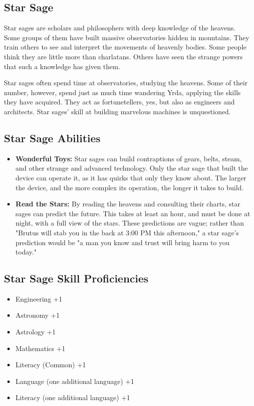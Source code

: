\begin{multicols}{2}
\section{Star Sage}

Star sages are scholars and philosophers with deep knowledge of the heavens.
Some groups of them have built massive observatories hidden in mountains. They
train others to see and interpret the movements of heavenly bodies. Some people
think they are little more than charlatans. Others have seen the strange powers
that such a knowledge has given them.

Star sages often spend time at observatories, studying the heavens. Some of their
number, however, spend just as much time wandering Yrda, applying the skills they
have acquired. They act as fortunetellers, yes, but also as engineers and architects.
Star sages' skill at building marvelous machines is unquestioned.

\subsection{Star Sage Abilities}

\begin{itemize}
  \item \textbf{Wonderful Toys:} Star sages can build contraptions of gears, belts,
    steam, and other strange and advanced technology. Only the star sage that built
    the device can operate it, as it has quirks that only they know about. The larger
    the device, and the more complex its operation, the longer it takes to build.
  \item \textbf{Read the Stars:} By reading the heavens and consulting their charts,
    star sages can predict the future. This takes at least an hour, and must be done
    at night, with a full view of the stars. These predictions are vague; rather than
    "Brutus will stab you in the back at 3:00 PM this afternoon," a star sage's prediction
    would be "a man you know and trust will bring harm to you today."
\end{itemize}

\subsection{Star Sage Skill Proficiencies}

\begin{itemize}
  \item Engineering +1
  \item Astronomy +1
  \item Astrology +1
  \item Mathematics +1
  \item Literacy (Common) +1
  \item Language (one additional language) +1
  \item Literacy (one additional language) +1
\end{itemize}


\end{multicols}
